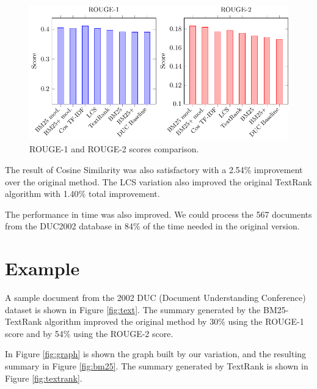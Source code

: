 \documentclass{llncs}
\begin{document}
\begin{figure}[h!]
    \centering
    \includegraphics[width=1\textwidth]{rouge-scores-en.pdf}
    \caption{ROUGE-1 and ROUGE-2 scores comparison.}
\end{figure}

The result of Cosine Similarity was also satisfactory with a 2.54\% improvement over the original method. The LCS variation also improved the original TextRank algorithm with 1.40\% total improvement.

The performance in time was also improved. We could process the 567 documents from the DUC2002 database in 84\% of the time needed in the original version.


\section{Example}
A sample document from the 2002 DUC (Document Understanding Conference) dataset \cite{duc2002-guidelines} is shown in Figure \ref{fig:text}. The summary generated by the BM25-TextRank algorithm improved the original method by 30\% using the ROUGE-1 score and by 54\% using the ROUGE-2 score.

In Figure \ref{fig:graph} is shown the graph built by our variation, and the resulting summary in Figure \ref{fig:bm25}. 
The summary generated by TextRank is shown in Figure \ref{fig:textrank}.
\end{document}
